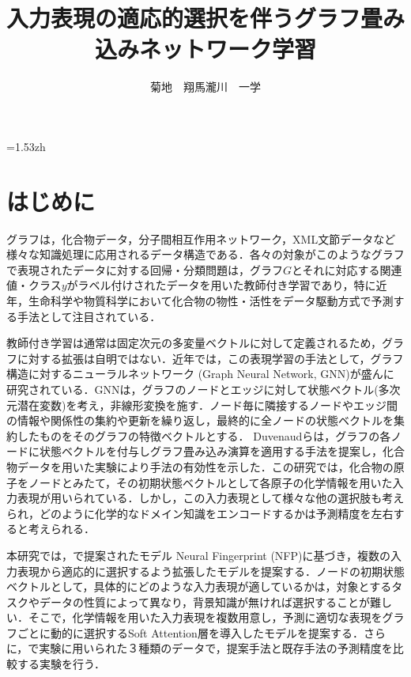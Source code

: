 \documentclass[twocolumn]{jarticle}
\title{\vspace{-4pt}\Large\gt 入力表現の適応的選択を伴うグラフ畳み込みネットワーク学習}
\author{菊地　翔馬\DAG \quad 瀧川　一学\DAG\DDAG\DDDAG}
\affiliation{\normalsize \DAG 北海道大学大学院情報科学研究科 \quad \DDAG 北海道大学化学反応創成研究拠点\quad \DDDAG JSTさきがけ}
\begin{document}
\maketitle
\makeetitle   
\baselineskip=1.53zh 

\fontsize{9pt}{12pt}\selectfont

\section{はじめに}
グラフは，化合物データ，分子間相互作用ネットワーク，XML文節データなど様々な知識処理に応用されるデータ構造である．各々の対象がこのようなグラフで表現されたデータに対する回帰・分類問題は，グラフ$G$とそれに対応する関連値・クラス$y$がラベル付けされたデータを用いた教師付き学習であり，特に近年，生命科学や物質科学において化合物の物性・活性をデータ駆動方式で予測する手法として注目されている．

教師付き学習は通常は固定次元の多変量ベクトルに対して定義されるため，グラフに対する拡張は自明ではない．近年では，この表現学習の手法として，グラフ構造に対するニューラルネットワーク (Graph Neural Network, GNN)が盛んに研究されている．GNNは，グラフのノードとエッジに対して状態ベクトル(多次元潜在変数)を考え，非線形変換を施す．ノード毎に隣接するノードやエッジ間の情報や関係性の集約や更新を繰り返し，最終的に全ノードの状態ベクトルを集約したものをそのグラフの特徴ベクトルとする\cite{MPNNs}．
Duvenaudらは，グラフの各ノードに状態ベクトルを付与しグラフ畳み込み演算を適用する手法を提案し，化合物データを用いた実験により手法の有効性を示した\cite{NNFP}．この研究では，化合物の原子をノードとみたて，その初期状態ベクトルとして各原子の化学情報を用いた入力表現が用いられている．しかし，この入力表現として様々な他の選択肢も考えられ，どのように化学的なドメイン知識をエンコードするかは予測精度を左右すると考えられる．

本研究では，\cite{NNFP}で提案されたモデル Neural Fingerprint (NFP)に基づき，複数の入力表現から適応的に選択するよう拡張したモデルを提案する．ノードの初期状態ベクトルとして，具体的にどのような入力表現が適しているかは，対象とするタスクやデータの性質によって異なり，背景知識が無ければ選択することが難しい．そこで，化学情報を用いた入力表現を複数用意し，予測に適切な表現をグラフごとに動的に選択するSoft Attention層を導入したモデルを提案する．さらに，\cite{NNFP}で実験に用いられた３種類のデータで，提案手法と既存手法の予測精度を比較する実験を行う．
\end{document}
